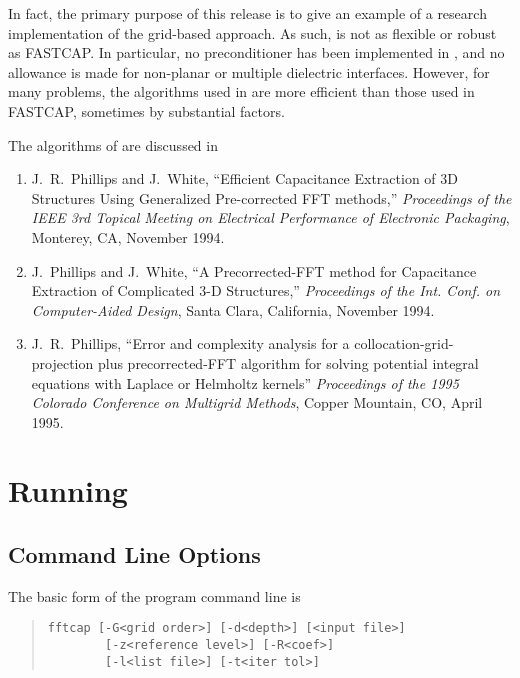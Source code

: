 In fact, the primary purpose of this release is to give an example of a
research implementation of the grid-based approach.  As such, \thecode is
not as flexible or robust as FASTCAP.  In particular, no preconditioner has
been implemented in \thecode, and no allowance is made for non-planar or
multiple dielectric interfaces.  However, for many problems, the algorithms
used in \thecode are more efficient than those used in FASTCAP, sometimes
by substantial factors. 

The algorithms of \thecode are discussed in 

\begin{enumerate}
\item J.~R.~Phillips and J.~White, ``Efficient Capacitance Extraction of 3D
  Structures Using Generalized Pre-corrected FFT methods,''  {\sl
    Proceedings of the IEEE 3rd Topical Meeting on Electrical Performance 
    of Electronic Packaging}, Monterey, CA, November 1994.

\item J.~Phillips and J.~White, ``A Precorrected-FFT method for Capacitance
  Extraction of Complicated 3-D Structures,'' {\sl Proceedings of the Int. Conf. on
    Computer-Aided Design}, Santa Clara, California, November 1994.

\item J.~R.~Phillips,  ``Error and complexity analysis for a
  collocation-grid-projection plus precorrected-{FFT} algorithm for solving
  potential integral equations with Laplace or Helmholtz kernels'' {\sl
 Proceedings of the 1995 Colorado Conference on Multigrid Methods}, Copper
Mountain, CO, April 1995. 

\end{enumerate}


\section{Running}

\subsection{Command Line Options}

The basic form of the \thecode program command line is
\begin{quote}
\begin{verbatim}
fftcap [-G<grid order>] [-d<depth>] [<input file>]
        [-z<reference level>] [-R<coef>] 
        [-l<list file>] [-t<iter tol>]
\end{verbatim}
\end{quote}

